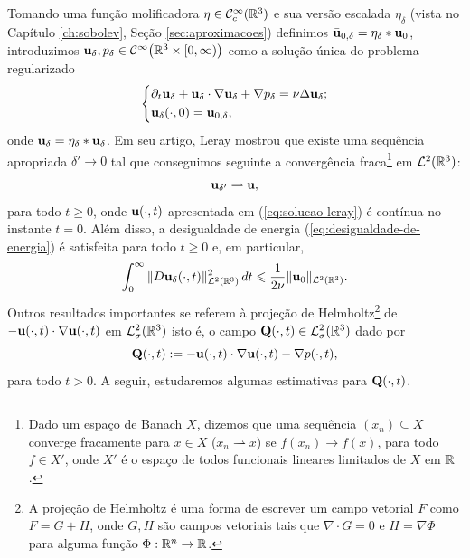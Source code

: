 Tomando uma função molificadora $\eta \in \mathcal{C}^{\infty}_c(\mathbb{R}^3)$ e sua versão escalada $\eta_\delta$ (vista no Capítulo \ref{ch:sobolev}, Seção \ref{sec:aproximacoes}) definimos $\bar{\mathbf{u}}_{0,\delta} = \eta_\delta * \mathbf{u}_0$, introduzimos $\mathbf{u}_\delta, p_\delta \in \mathcal{C}^{\infty}\big( \mathbb{R}^3 \times [0,\infty) \big)$ como a solução única do problema regularizado
\begin{equation} \label{eq:navier-stokes-regularizado}
    \left\{
        \begin{aligned}
        &\partial_t \mathbf{u}_\delta + \bar {\mathbf{u}}_\delta \cdot \nabla \mathbf{u}_\delta  + \nabla p_\delta= \nu \Delta \mathbf{u}_\delta;\\
        &\mathbf{u}_\delta(\cdot,0) = \bar {\mathbf{u}}_{0,\delta},
        \end{aligned}
    \right.
\end{equation}
onde $\bar{\mathbf{u}}_\delta = \eta_\delta * \mathbf{u}_\delta$. Em seu artigo, Leray mostrou que existe uma sequência apropriada $\delta' \to 0$ tal que conseguimos seguinte a convergência fraca\footnote{Dado um espaço de Banach $X$, dizemos que uma sequência $(x_n) \subseteq X$ converge fracamente para $x \in X$ ($x_n \rightharpoonup x$) se $f(x_n) \to f(x)$, para todo $f \in X'$, onde $X'$ é o espaço de todos funcionais lineares limitados de $X$ em $\mathbb{R}$.} em $\mathcal{L}^2(\mathbb{R}^3)$:
\begin{equation} \label{eq:b1}
    \mathbf{u}_{\delta'} \rightharpoonup \mathbf{u},
\end{equation}
para todo $t \geqslant 0$, onde $\mathbf{u}(\cdot,t)$ apresentada em (\ref{eq:solucao-leray}) é contínua no instante $t = 0$.
Além disso, a desigualdade de energia (\ref{eq:desigualdade-de-energia}) é satisfeita para todo $t \geqslant 0$ e, em particular,
\begin{equation} \label{eq:2.3}
    \int_0^\infty \Vert D\mathbf{u}_\delta(\cdot,t) \Vert_{\mathcal{L}^2(\mathbb{R}^3)}^2 \,dt \leqslant \frac{1}{2\nu} \Vert \mathbf{u}_{0} \Vert_{\mathcal{L}^2(\mathbb{R}^3)}.
\end{equation}
Outros resultados importantes se referem à projeção de Helmholtz\footnote{A projeção de Helmholtz é uma forma de escrever um campo vetorial $F$ como $F = G + H$, onde $G, H$ são campos vetoriais tais que $\nabla \cdot G = 0$ e $H = \nabla \Phi$ para alguma função $\Phi : \mathbb{R}^n \to \mathbb{R}$.} de $-\mathbf{u}(\cdot,t) \cdot \nabla \mathbf{u}(\cdot,t)$ em $\mathcal{L}^2_\sigma(\mathbb{R}^3)$ isto é, o campo $\mathbf{Q}(\cdot,t) \in \mathcal{L}^2_\sigma(\mathbb{R}^3)$ dado por
\begin{equation} \label{eq:defQ}
    \mathbf{Q}(\cdot,t) := -\mathbf{u}(\cdot,t) \cdot \nabla \mathbf{u}(\cdot,t) - \nabla p(\cdot,t),
\end{equation}
para todo $t > 0$.
A seguir, estudaremos algumas estimativas para $\mathbf{Q}(\cdot,t)$.

